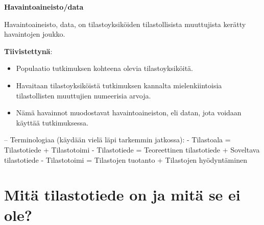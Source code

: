 \documentclass[
]{book}
\providecommand{\tightlist}{%
  \setlength{\itemsep}{0pt}\setlength{\parskip}{0pt}}
\begin{document}
\begin{noteblock}{}
\textbf{Havaintoaineisto/data}

Havaintoaineisto, data, on tilastoyksiköiden tilastollisista muuttujista kerätty havaintojen joukko.

\end{noteblock}

\textbf{Tiivistettynä}:

\begin{itemize}
\tightlist
\item
  Populaatio tutkimuksen kohteena olevia tilastoyksiköitä.
\item
  Havaitaan tilastoyksiköistä tutkimuksen kannalta mielenkiintoisia tilastollisten muuttujien numeerisia arvoja.
\item
  Nämä havainnot muodostavat havaintoaineiston, eli datan, jota voidaan käyttää tutkimuksessa.
\end{itemize}

-- Terminologiaa (käydään vielä läpi tarkemmin jatkossa):
- Tilastoala = Tilastotiede + Tilastotoimi
- Tilastotiede = Teoreettinen tilastotiede + Soveltava tilastotiede
- Tilastotoimi = Tilastojen tuotanto + Tilastojen hyödyntäminen

\hypertarget{mituxe4-tilastotiede-on-ja-mituxe4-se-ei-ole}{%
\section{Mitä tilastotiede on ja mitä se ei ole?}\label{mituxe4-tilastotiede-on-ja-mituxe4-se-ei-ole}}
\end{document}
